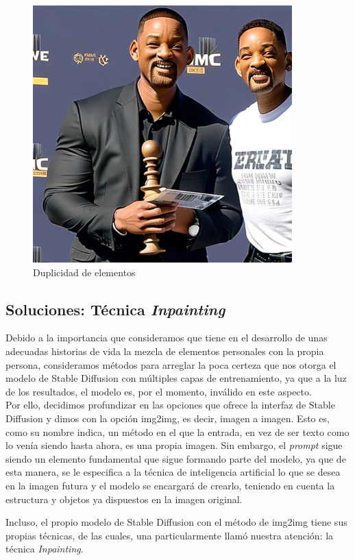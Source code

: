 \begin{itemize}
\begin{figure}[h]
	\centering
	\includegraphics[width = 0.5
	\textwidth]{Imagenes/Vectorial/duplicidad_will.png}
	\caption{Duplicidad de elementos}
	\label{fig:willpor2}
\end{figure}

\subsection{Soluciones: Técnica \textit{Inpainting}}

Debido a la importancia que consideramos que tiene en el desarrollo de unas adecuadas historias de vida la mezcla de elementos personales con la propia persona, consideramos métodos para arreglar la poca certeza que nos otorga el modelo de Stable Diffusion con múltiples capas de entrenamiento, ya que a la luz de los resultados, el modelo es, por el momento, inválido en este aspecto. \\

Por ello, decidimos profundizar en las opciones que ofrece la interfaz de Stable Diffusion y dimos con la opción img2img, es decir, imagen a imagen. Esto es, como su nombre indica, un método en el que la entrada, en vez de ser texto como lo venía siendo hasta ahora, es una propia imagen. Sin embargo, el \textit{prompt} sigue siendo un elemento fundamental que sigue formando parte del modelo, ya que de esta manera, se le especifica a la técnica de inteligencia artificial lo que se desea en la imagen futura y el modelo se encargará de crearlo, teniendo en cuenta la estructura y objetos ya dispuestos en la imagen original. 

Incluso, el propio modelo de Stable Diffusion con el método de img2img tiene sus propias técnicas, de las cuales, una particularmente llamó nuestra atención: la técnica \textit{Inpainting}. 


\end{itemize}

